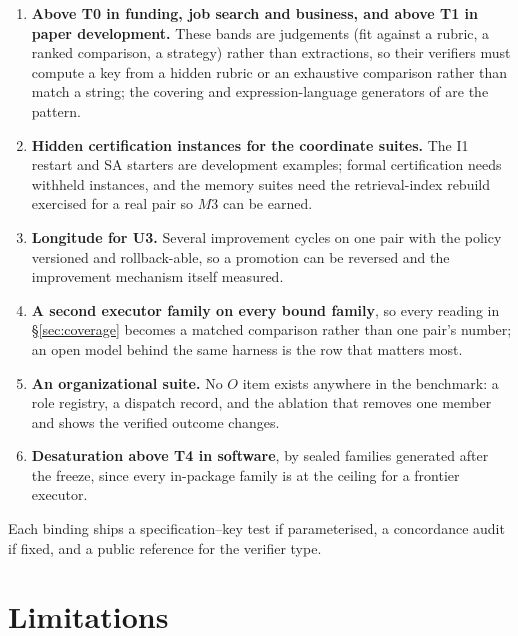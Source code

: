 \documentclass[11pt]{article}
\theoremstyle{definition}
\begin{document}
\begin{enumerate}[leftmargin=*]
\item \textbf{Above T0 in funding, job search and business, and above T1 in paper development.} These bands are judgements (fit against a rubric, a ranked comparison, a strategy) rather than extractions, so their verifiers must compute a key from a hidden rubric or an exhaustive comparison rather than match a string; the covering and expression-language generators of \citet{yang2026unified} are the pattern.
\item \textbf{Hidden certification instances for the coordinate suites.} The I1 restart and SA starters are development examples; formal certification needs withheld instances, and the memory suites need the retrieval-index rebuild exercised for a real pair so $M3$ can be earned.
\item \textbf{Longitude for U3.} Several improvement cycles on one pair with the policy versioned and rollback-able, so a promotion can be reversed and the improvement mechanism itself measured.
\item \textbf{A second executor family on every bound family}, so every reading in \S\ref{sec:coverage} becomes a matched comparison rather than one pair's number; an open model behind the same harness is the row that matters most.
\item \textbf{An organizational suite.} No $O$ item exists anywhere in the benchmark: a role registry, a dispatch record, and the ablation that removes one member and shows the verified outcome changes.
\item \textbf{Desaturation above T4 in software}, by sealed families generated after the freeze, since every in-package family is at the ceiling for a frontier executor.
\end{enumerate}

Each binding ships a specification--key test if parameterised, a concordance audit if fixed, and a public reference for the verifier type.

\section{Limitations}\label{sec:limits}
\end{document}
